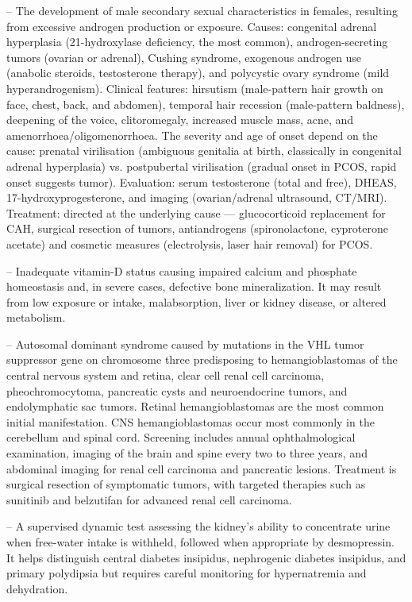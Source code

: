 -- The development of male secondary sexual characteristics in females, resulting from excessive androgen production or exposure. Causes: congenital adrenal hyperplasia (21-hydroxylase deficiency, the most common), androgen-secreting tumors (ovarian or adrenal), Cushing syndrome, exogenous androgen use (anabolic steroids, testosterone therapy), and polycystic ovary syndrome (mild hyperandrogenism). Clinical features: hirsutism (male-pattern hair growth on face, chest, back, and abdomen), temporal hair recession (male-pattern baldness), deepening of the voice, clitoromegaly, increased muscle mass, acne, and amenorrhoea/oligomenorrhoea. The severity and age of onset depend on the cause: prenatal virilisation (ambiguous genitalia at birth, classically in congenital adrenal hyperplasia) vs. postpubertal virilisation (gradual onset in PCOS, rapid onset suggests tumor). Evaluation: serum testosterone (total and free), DHEAS, 17-hydroxyprogesterone, and imaging (ovarian/adrenal ultrasound, CT/MRI). Treatment: directed at the underlying cause — glucocorticoid replacement for CAH, surgical resection of tumors, antiandrogens (spironolactone, cyproterone acetate) and cosmetic measures (electrolysis, laser hair removal) for PCOS.

-- Inadequate vitamin-D status causing impaired calcium and phosphate homeostasis and, in severe cases, defective bone mineralization. It may result from low exposure or intake, malabsorption, liver or kidney disease, or altered metabolism.

-- Autosomal dominant syndrome caused by mutations in the VHL tumor suppressor gene on chromosome three predisposing to hemangioblastomas of the central nervous system and retina, clear cell renal cell carcinoma, pheochromocytoma, pancreatic cysts and neuroendocrine tumors, and endolymphatic sac tumors. Retinal hemangioblastomas are the most common initial manifestation. CNS hemangioblastomas occur most commonly in the cerebellum and spinal cord. Screening includes annual ophthalmological examination, imaging of the brain and spine every two to three years, and abdominal imaging for renal cell carcinoma and pancreatic lesions. Treatment is surgical resection of symptomatic tumors, with targeted therapies such as sunitinib and belzutifan for advanced renal cell carcinoma.

-- A supervised dynamic test assessing the kidney's ability to concentrate urine when free-water intake is withheld, followed when appropriate by desmopressin. It helps distinguish central diabetes insipidus, nephrogenic diabetes insipidus, and primary polydipsia but requires careful monitoring for hypernatremia and dehydration.

